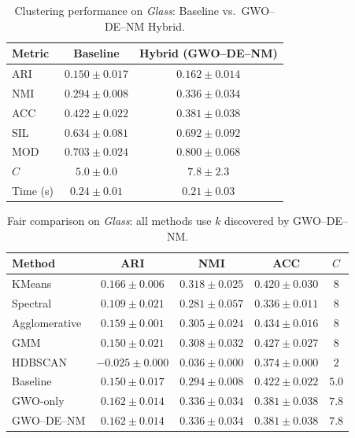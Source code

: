 \begin{table}[htbp]
\centering
\caption{Clustering performance on \textit{Glass}: Baseline vs.\ GWO--DE--NM Hybrid.}
\label{tab:glass}
\begin{tabular}{lcc}
\toprule
Metric & Baseline & Hybrid (GWO--DE--NM) \\
\midrule
ARI & $0.150 \pm 0.017$ & $\mathbf{0.162 \pm 0.014}$ \\
NMI & $0.294 \pm 0.008$ & $\mathbf{0.336 \pm 0.034}$ \\
ACC & $\mathbf{0.422 \pm 0.022}$ & $0.381 \pm 0.038$ \\
SIL & $0.634 \pm 0.081$ & $\mathbf{0.692 \pm 0.092}$ \\
MOD & $0.703 \pm 0.024$ & $\mathbf{0.800 \pm 0.068}$ \\
\midrule
$C$ & $5.0 \pm 0.0$ & $7.8 \pm 2.3$ \\
Time (s) & $0.24 \pm 0.01$ & $0.21 \pm 0.03$ \\
\bottomrule
\end{tabular}
\end{table}

\begin{table}[htbp]
\centering\small
\caption{Fair comparison on \textit{Glass}: all methods use $k$ discovered by GWO--DE--NM.}
\label{tab:fair_glass}
\begin{tabular}{lcccc}
\toprule
Method & ARI & NMI & ACC & $C$ \\
\midrule
KMeans & $\mathbf{0.166 \pm 0.006}$ & $0.318 \pm 0.025$ & $0.420 \pm 0.030$ & $8$ \\
Spectral & $0.109 \pm 0.021$ & $0.281 \pm 0.057$ & $0.336 \pm 0.011$ & $8$ \\
Agglomerative & $0.159 \pm 0.001$ & $0.305 \pm 0.024$ & $0.434 \pm 0.016$ & $8$ \\
GMM & $0.150 \pm 0.021$ & $0.308 \pm 0.032$ & $0.427 \pm 0.027$ & $8$ \\
HDBSCAN & $-0.025 \pm 0.000$ & $0.036 \pm 0.000$ & $0.374 \pm 0.000$ & $2$ \\
\midrule
Baseline & $0.150 \pm 0.017$ & $0.294 \pm 0.008$ & $0.422 \pm 0.022$ & $5.0$ \\
GWO-only & $0.162 \pm 0.014$ & $0.336 \pm 0.034$ & $0.381 \pm 0.038$ & $7.8$ \\
GWO--DE--NM & $0.162 \pm 0.014$ & $0.336 \pm 0.034$ & $0.381 \pm 0.038$ & $7.8$ \\
\bottomrule
\end{tabular}
\end{table}

